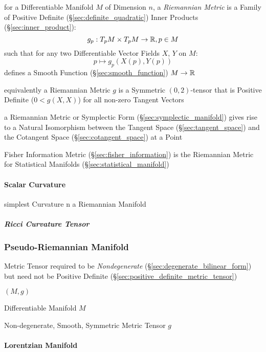 for a Differentiable Manifold $M$ of Dimension $n$, a \emph{Riemannian
  Metric} is a Family of Positive Definite
(\S\ref{sec:definite_quadratic}) Inner Products
(\S\ref{sec:inner_product}):
\[
  g_p : T_p M \times T_p M \rightarrow \mathbb{R}, p \in M
\]
such that for any two Differentiable Vector Fields $X$, $Y$ on $M$:
\[
  p \mapsto g_p (X(p), Y(p))
\]
defines a Smooth Function (\S\ref{sec:smooth_function}) $M \rightarrow
\mathbb{R}$

equivalently a Riemannian Metric $g$ is a Symmetric $(0,2)$-tensor
that is Positive Definite ($0 < g(X,X)$) for all non-zero Tangent
Vectors %

a Riemannian Metric or Symplectic Form (\S\ref{sec:symplectic_manifold}) gives
rise to a Natural Isomorphism between the Tangent Space
(\S\ref{sec:tangent_space}) and the Cotangent Space
(\S\ref{sec:cotangent_space}) at a Point

\fist Fisher Information Metric (\S\ref{sec:fisher_information}) is
the Riemannian Metric for Statistical Manifolds
(\S\ref{sec:statistical_manifold})



\paragraph{Scalar Curvature}\label{sec:scalar_curvature}\hfill

simplest Curvature n a Riemannian Manifold



\subparagraph{Ricci Curvature Tensor}\label{sec:ricci_curvature}\hfill



\subsubsection{Pseudo-Riemannian Manifold}
\label{sec:pseudo_riemannian}

Metric Tensor required to be \emph{Nondegenerate}
(\S\ref{sec:degenerate_bilinear_form}) but need not be Positive
Definite (\S\ref{sec:positive_definite_metric_tensor})

$(M,g)$

Differentiable Manifold $M$

Non-degenerate, Smooth, Symmetric Metric Tensor $g$



\paragraph{Lorentzian Manifold}\label{sec:lorentzian_manifold}\hfill

